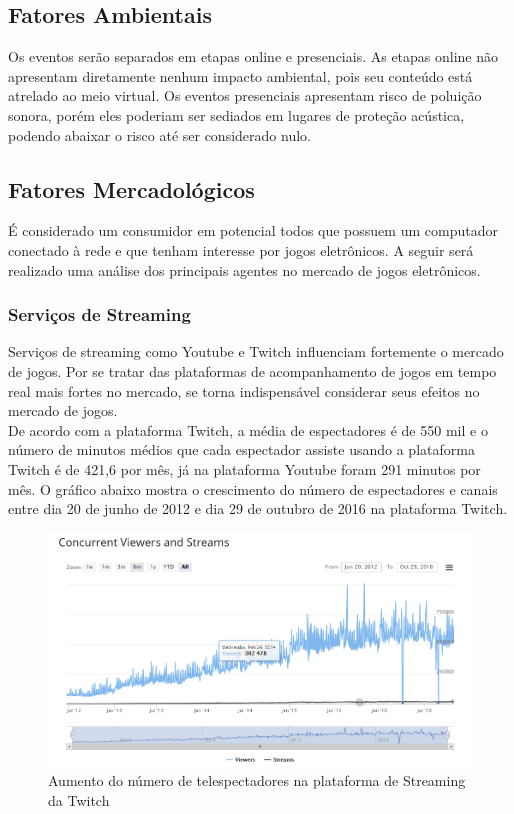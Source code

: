 \documentclass[a4paper, 12pt]{paper}
\begin{document}
\subsection{Fatores Ambientais}
Os eventos serão separados em etapas online e presenciais. As etapas online não apresentam diretamente nenhum impacto ambiental, pois seu conteúdo está atrelado ao meio virtual. Os eventos presenciais apresentam risco de poluição sonora, porém eles poderiam ser sediados em lugares de proteção acústica, podendo abaixar o risco até ser considerado nulo.
\subsection{Fatores Mercadológicos}
É considerado um consumidor em potencial todos que possuem um computador conectado à rede e que tenham interesse por jogos eletrônicos. A seguir será realizado uma análise dos principais agentes no mercado de jogos eletrônicos.
\subsubsection{Serviços de Streaming}
Serviços de streaming como Youtube e Twitch influenciam fortemente o mercado de jogos. Por se tratar das plataformas de acompanhamento de jogos em tempo real mais fortes no mercado, se torna indispensável considerar seus efeitos no mercado de jogos. \\
De acordo com a plataforma Twitch, a média de espectadores é de 550 mil e o número de minutos médios que cada espectador assiste usando a plataforma Twitch é de 421,6 por mês, já na plataforma Youtube foram 291 minutos por mês. O gráfico abaixo mostra o crescimento do número de espectadores e canais entre dia 20 de junho de 2012 e dia 29 de outubro de 2016 na plataforma Twitch.
\begin{figure}[!ht]
	\centering
	\includegraphics[scale=0.6]{img/img03.png}
	\caption{Aumento do número de telespectadores na plataforma de Streaming da Twitch}	
\end{figure}
\end{document}
